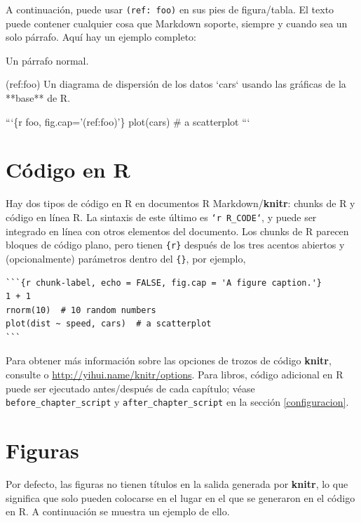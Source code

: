 \documentclass[12pt,]{krantz}
\makeatletter
\newenvironment{Shaded}{\begin{snugshade}}{\end{snugshade}}
\newcommand{\BaseNTok}[1]{\textcolor[rgb]{0.00,0.00,0.81}{{#1}}}
\newcommand{\NormalTok}[1]{{#1}}
\newenvironment{kframe}{%
\medskip{}
\setlength{\fboxsep}{.8em}
 \def\at@end@of@kframe{}%
 \ifinner\ifhmode%
  \def\at@end@of@kframe{\end{minipage}}%
  \begin{minipage}{\columnwidth}%
 \fi\fi%
 \def\FrameCommand##1{\hskip\@totalleftmargin \hskip-\fboxsep
 \colorbox{shadecolor}{##1}\hskip-\fboxsep
     \hskip-\linewidth \hskip-\@totalleftmargin \hskip\columnwidth}%
 \MakeFramed {\advance\hsize-\width
   \@totalleftmargin\z@ \linewidth\hsize
   \@setminipage}}%
 {\par\unskip\endMakeFramed%
 \at@end@of@kframe}
\renewenvironment{Shaded}{\begin{kframe}}{\end{kframe}}
\theoremstyle{definition}
\theoremstyle{definition}
\theoremstyle{remark}
\makeatother
\begin{document}
A continuación, puede usar \texttt{(ref:\ foo)} en sus pies de
figura/tabla. El texto puede contener cualquier cosa que Markdown
soporte, siempre y cuando sea un solo párrafo. Aquí hay un ejemplo
completo:

\begin{Shaded}
\begin{Highlighting}[]
\NormalTok{Un párrafo normal.}

\NormalTok{(ref:foo) Un diagrama de dispersión de los datos }\BaseNTok{`cars`} \NormalTok{usando las gráficas de la **base** de R. }

\NormalTok{```\{r foo, fig.cap='(ref:foo)'\}}
\NormalTok{plot(cars)  # a scatterplot}
\NormalTok{```}
\end{Highlighting}
\end{Shaded}

\section{Código en R}\label{codigo-en-r}

Hay dos tipos de código en R en documentos R Markdown/\textbf{knitr}:
chunks de R y código en línea R. La sintaxis de este último es
\texttt{`r\ R\_CODE`}, y puede ser integrado en línea con otros
elementos del documento. Los chunks de R parecen bloques de código
plano, pero tienen \texttt{\{r\}} después de los tres acentos abiertos y
(opcionalmente) parámetros dentro del \texttt{\{\}}, por ejemplo,

\begin{verbatim}
```{r chunk-label, echo = FALSE, fig.cap = 'A figure caption.'}
1 + 1
rnorm(10)  # 10 random numbers
plot(dist ~ speed, cars)  # a scatterplot
```
\end{verbatim}

Para obtener más información sobre las opciones de trozos de código
\textbf{knitr}, consulte \citet{xie2015} o
\url{http://yihui.name/knitr/options}. Para libros, código adicional en
R puede ser ejecutado antes/después de cada capítulo; véase
\texttt{before\_chapter\_script} y \texttt{after\_chapter\_script} en la
sección \ref{configuracion}.

\section{Figuras}\label{figuras}

Por defecto, las figuras no tienen títulos en la salida generada por
\textbf{knitr}, lo que significa que solo pueden colocarse en el lugar
en el que se generaron en el código en R. A continuación se muestra un
ejemplo de ello.
\end{document}

